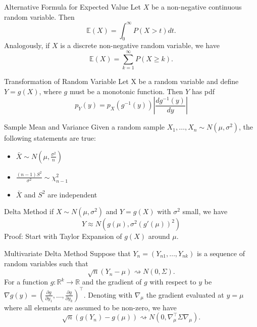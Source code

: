\documentclass[avery5371,grid]{flashcards}
\begin{document}
\begin{flashcard}[Theorem]{Alternative Formula for Expected Value}
Let $X$ be a non-negative continuous random variable. Then 
\[
\mathbb E(X) = \int_0^\infty P\left(X > t\right) dt.
\]
Analogously, if $X$ is a discrete non-negative random variable, we have
\[
\mathbb E(X) = \sum_{k=1}^\infty P(X \ge k).
\]
\end{flashcard}

\begin{flashcard}[Theorem]{Transformation of Random Variable}
Let X be a random variable and define $Y=g(X)$, where $g$ must be a monotonic function. Then $Y$ has pdf
\[
p_Y(y) = p_X\left(g^{-1}(y)\right) \left| \frac{dg^{-1}(y)}{dy} \right|
\]
\end{flashcard}

\begin{flashcard}[Theorem]{Sample Mean and Variance}
Given a random sample $X_1,\ldots,X_n \sim N\left(\mu,\sigma^2\right)$, the following statements are true:
\begin{itemize}
 \item $\bar X \sim N\left(\mu,\frac{\sigma^2}{n}\right)$
 \item $\frac{(n-1)S^2}{\sigma^2} \sim \chi^2_{n-1}$
 \item $\bar X$ and $S^2$ are independent
\end{itemize}

\end{flashcard}

\begin{flashcard}[Theorem]{Delta Method}
if $X\sim N\left(\mu,\sigma^2\right)$ and $Y=g(X)$ with $\sigma^2$ small, we have
\[ Y \approx N\left(g(\mu),\sigma^2(g'(\mu))^2\right)\]
Proof: Start with Taylor Expansion of $g(X)$ around $\mu$.
\end{flashcard}

\begin{flashcard}[Theorem]{Multivariate Delta Method}
 Suppose that $Y_n = \left( Y_{n1}, \ldots, Y_{nk} \right)$ is a sequence of random variables such that 
 \[
 \sqrt{n}\left( Y_n - \mu \right) \rightsquigarrow N(0,\Sigma).
 \]
For a function $g: \mathbb R^k \to \mathbb R$ and the gradient of $g$ with respect to $y$ be $\nabla g(y) = \left( \frac{\partial g}{\partial y_1}, \ldots, \frac{\partial g}{\partial y_k} \right)^\intercal$. Denoting 
with $\nabla_\mu$ the gradient evaluated at $y=\mu$ where all elements are assumed to be non-zero, we have
\[
\sqrt{n}\left( g(Y_n) - g(\mu) \right) \rightsquigarrow N\left(0,\nabla_\mu^\intercal \Sigma \nabla_\mu \right).
\]
\end{flashcard}
\end{document}
